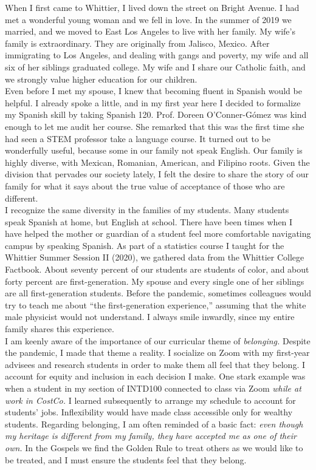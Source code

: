 \documentclass[../../main.tex]{subfiles}
\begin{document}
When I first came to Whittier, I lived down the street on Bright Avenue.  I had met a wonderful young woman and we fell in love.  In the summer of 2019 we married, and we moved to East Los Angeles to live with her family.  My wife's family is extraordinary.  They are originally from Jalisco, Mexico.  After immigrating to Los Angeles, and dealing with gangs and poverty, my wife and all six of her siblings graduated college.  My wife and I share our Catholic faith, and we strongly value higher education for our children.
\\
\vspace{0.15cm}
Even before I met my spouse, I knew that becoming fluent in Spanish would be helpful.  I already spoke a little, and in my first year here I decided to formalize my Spanish skill by taking Spanish 120. Prof. Doreen O'Conner-G\'{o}mez was kind enough to let me audit her course.  She remarked that this was the first time she had seen a STEM professor take a language course.  It turned out to be wonderfully useful, because some in our family not speak English.  Our family is highly diverse, with Mexican, Romanian, American, and Filipino roots.  Given the division that pervades our society lately, I felt the desire to share the story of our family for what it says about the true value of acceptance of those who are different.
\\
\vspace{0.15cm}
I recognize the same diversity in the families of my students.  Many students speak Spanish at home, but English at school.  There have been times when I have helped the mother or guardian of a student feel more comfortable navigating campus by speaking Spanish.  As part of a statistics course I taught for the Whittier Summer Session II (2020), we gathered data from the Whittier College Factbook.  About seventy percent of our students are students of color, and about forty percent are first-generation.  My spouse and every single one of her siblings are all first-generation students.  Before the pandemic, sometimes colleagues would try to teach me about ``the first-generation experience,'' assuming that the white male physicist would not understand.  I always smile inwardly, since my entire family shares this experience.
\\
\vspace{0.15cm}
I am keenly aware of the importance of our curricular theme of \textit{belonging.}  Despite the pandemic, I made that theme a reality.  I socialize on Zoom with my first-year advisees and research students in order to make them all feel that they belong.  I account for equity and inclusion in each decision I make.  One stark example was when a student in my section of INTD100 connected to class via Zoom \textit{while at work in CostCo.}  I learned subsequently to arrange my schedule to account for students' jobs.  Inflexibility would have made class accessible only for wealthy students.  Regarding belonging, I am often reminded of a basic fact: \textit{even though my heritage is different from my family, they have accepted me as one of their own.}  In the Gospels we find the Golden Rule to treat others as we would like to be treated, and I must ensure the students feel that they belong.
\end{document}
